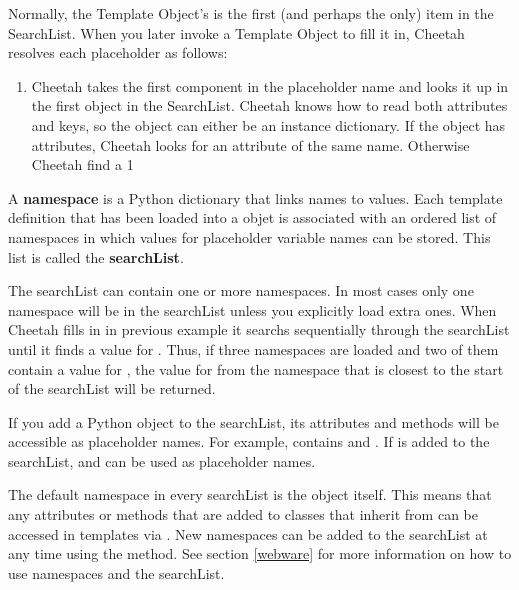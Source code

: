 \begin{enumerate}
Normally, the Template Object's  is the
first (and perhaps the only) item in the SearchList.  
When you later invoke a Template
Object to fill it in, Cheetah resolves each placeholder as follows:


\begin{enumerate}

\item Cheetah takes the first component in the placeholder name and looks it up
     in the first object in the SearchList.  Cheetah knows how to read both
     attributes and keys, so the object can either be an instance
     dictionary.  If the object has attributes, Cheetah looks for an attribute
     of the same name.  Otherwise Cheetah
     find a 1

\end{enumerate}

A {\bf namespace} is a Python dictionary that links names to values. Each
template definition that has been loaded into a  objet is
associated with an ordered list of namespaces in which values for placeholder
variable names can be stored.  This list is called the {\bf searchList}.

The searchList can contain one or more namespaces.  In most cases only one
namespace will be in the searchList unless you explicitly load extra ones.  When
Cheetah fills in  in previous example it searchs
sequentially through the searchList until it finds a value for .
Thus, if three namespaces are loaded and two of them contain a value for
, the value for  from the namespace that is
closest to the start of the searchList will be returned.

If you add a Python object to the searchList, its attributes and methods will be
accessible as placeholder names.  For example,  contains
 and .  If  is added to the
searchList,  and  can be used as placeholder
names.  

The default namespace in every searchList is the  object itself.
This means that any attributes or methods that are added to classes that inherit
from  can be accessed in templates via .  New
namespaces can be added to the searchList at any time using the
 method.  See section \ref{webware} for more
information on how to use namespaces and the searchList.


\end{enumerate}
